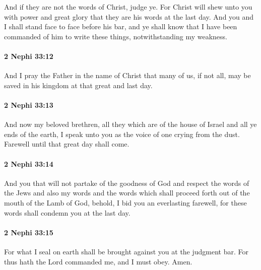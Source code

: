 			And if they are not the words of Christ, judge ye.
			For Christ will shew unto you with power and great glory
			that they are his words
			at the last day.
			And you and I shall stand face to face before his bar,
			and ye shall know that I have been commanded of him
			to write these things, notwithstanding my weakness.

		\paragraph{2 Nephi 33:12} %
			\label{2NEPHI-33-12}

			And I pray the Father in the name of Christ
			that many of us, if not all, may be saved in his kingdom
			at that great and last day.

		\paragraph{2 Nephi 33:13} %
			\label{2NEPHI-33-13}

			And now my beloved brethren,
			all they which are of the house of Israel and all ye ends of the earth,
			I speak unto you as the voice of one crying from the dust.
			Farewell until that great day shall come.

		\paragraph{2 Nephi 33:14} %
			\label{2NEPHI-33-14}

			And you that will not partake of the goodness of God
			and respect the words of the Jews and also my words
			and the words which shall proceed forth out of the mouth of the Lamb of God,
			behold, I bid you an everlasting farewell,
			for these words shall condemn you at the last day.

		\paragraph{2 Nephi 33:15} %
			\label{2NEPHI-33-15}

			For what I seal on earth shall be brought against you at the judgment bar.
			For thus hath the Lord commanded me,
			and I must obey.
			Amen.